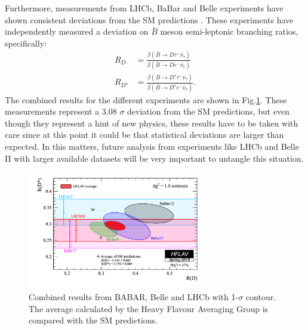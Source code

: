 Furthermore, measurements from LHCb, BaBar and Belle experiments have shown consistent deviations from the SM predictions \cite{Ciezarek_2017}. These experiments have independently measured a deviation on $\bar{B}$ meson semi-leptonic branching ratios, specifically:
\begin{align}
	R_D&=\frac{\beta(\bar{B}\to D\tau^-\bar{\nu}_\tau)}{\beta(\bar{B}\to De^-\bar{\nu}_e)}
	\\
	R_{D^\star}&=\frac{\beta(\bar{B}\to D^\star\tau^-\bar{\nu}_\tau)}{\beta(\bar{B}\to D^\star e^-\bar{\nu}_e)}.
\end{align}
The combined results for the different experiments are shown in Fig.\ref{Fig3}. These measurements represent a 3.08 $\sigma$
 deviation from the SM predictions, but even though they represent a hint of new physics, these results have to be taken with care since at this point it could be that statistical deviations are larger than expected. In this matters, future analysis from experiments like LHCb and Belle II with larger available datasets will be very important to untangle this situation.
 \begin{figure}[h]
 	\centering
 	\includegraphics[width=0.7\textwidth]{figures/Fig3}
 	\caption{Combined results from BABAR, Belle and LHCb with 1-$\sigma$ contour. The average calculated by the Heavy Flavour Averaging Group \cite{HFAG}  is compared with the SM predictions.}
 	\label{Fig3}
 \end{figure}